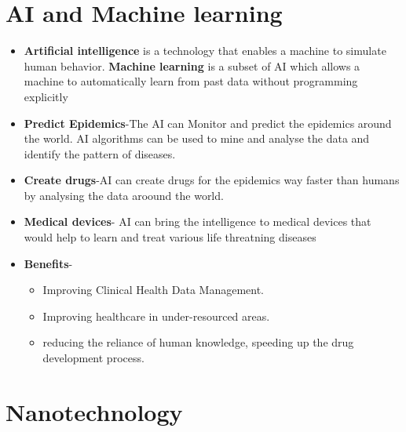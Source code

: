 \documentclass[12pt]{article}
\begin{document}
\section{AI and Machine learning}
\begin{itemize}

\item \textbf{Artificial intelligence} is a technology that enables a machine to simulate human behavior. \textbf{Machine learning} is a subset of AI which allows a machine to automatically learn from past data without programming explicitly

\item \textbf{Predict Epidemics}-The AI can Monitor and predict the epidemics around the world. AI algorithms can be used to mine and analyse the data and identify the pattern of diseases.

\item \textbf{Create drugs}-AI can create drugs for the epidemics way faster than humans by analysing the data aroound the world.

\item \textbf{Medical devices}- AI can bring the intelligence to medical devices that would help to
learn and treat various life threatning diseases

\item \textbf{Benefits}-

\begin{itemize}

\item Improving Clinical Health Data Management.
\item Improving healthcare in under-resourced areas.
\item reducing the reliance of human knowledge, speeding up the drug development process.
\end{itemize}


\end{itemize}


\section{Nanotechnology}
\end{document}

